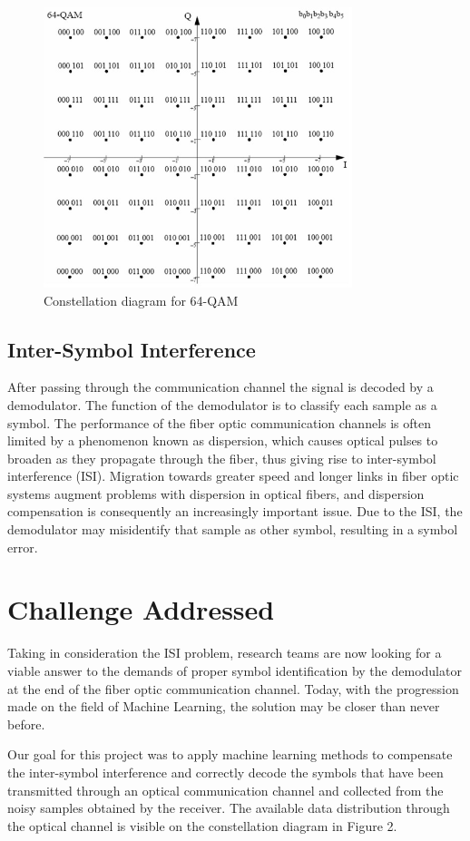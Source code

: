 \documentclass[10pt]{IEEEtran}
\begin{document}
\begin{figure}[H]
\centering
\includegraphics[width=9cm]{figure1.jpg}
\caption{Constellation diagram for 64-QAM}
\end{figure}

\subsection{Inter-Symbol Interference}
After passing through the communication channel the signal is decoded by a demodulator. The function of the demodulator is to classify each sample as a symbol. 
The performance of the fiber optic communication channels is often limited by a phenomenon known as dispersion, which causes optical pulses to broaden as they propagate through the fiber, thus giving rise to inter-symbol interference (ISI). 
Migration towards greater speed and longer links in fiber optic systems augment problems with dispersion in optical fibers, and dispersion compensation is consequently an increasingly important issue. Due to the ISI, the demodulator may misidentify that sample as other symbol, resulting in a symbol error.

\section{Challenge Addressed} %

Taking in consideration the ISI problem, research teams are now looking for a viable answer to the demands of proper symbol identification by the demodulator at the end of the fiber optic communication channel. Today, with the progression made on the field of Machine Learning, the solution may be closer than never before.

Our goal for this project was to apply machine learning methods to compensate the inter-symbol interference and correctly decode the symbols that have been transmitted through an optical communication channel and collected from the noisy samples obtained by the receiver. The available data distribution through the optical channel is visible on the constellation diagram in Figure 2.
\end{document}
